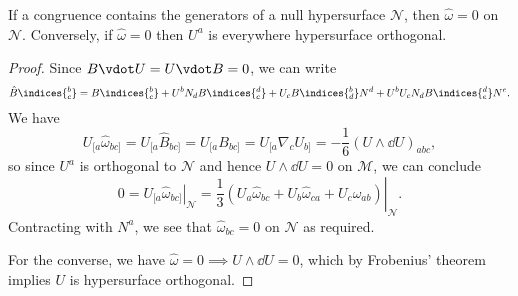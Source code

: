 \documentclass{jknotes}
\begin{document}
\begin{lemma}
    If a congruence contains the generators of a null hypersurface \(\mathcal{N}\), then \(\hat{\omega}=0\) on \(\mathcal{N}\). Conversely, if \(\hat{\omega}=0\) then \(U^a\) is everywhere hypersurface orthogonal.
\end{lemma}
\begin{proof}
    Since \(B\vdot U = U\vdot B = 0\), we can write 
    \begin{equation}
        \hat{B}\indices{^b_c} = B\indices{^b_c} + U^bN_dB\indices{^d_c} + U_cB\indices{^b_d}N^d + U^bU_c N_dB\indices{^d_e}N^e.
    \end{equation}
    We have
    \begin{equation}
        U_{[a}\hat{\omega}_{bc]} = U_{[a}\hat{B}_{bc]} 
                                 = U_{[a}B_{bc]} 
                                 = U_{[a}\nabla_cU_{b]} 
                                 = - \frac{1}{6} (U\wedge\dd{U})_{abc},
    \end{equation}
    so since \(U^a\) is orthogonal to \(\mathcal{N}\) and hence \(U\wedge\dd{U} = 0\) on \(\mathcal{M}\), we can conclude
    \begin{equation}
        0 = \left. U_{[a}\hat{\omega}_{bc]} \right|_{\mathcal{N}} = \left.\frac{1}{3}(U_a\hat{\omega}_{bc} + U_b\hat{\omega}_{ca} + U_c\hat{\omega}_{ab}) \right|_{\mathcal{N}}.
    \end{equation}
    Contracting with \(N^a\), we see that \(\hat{\omega}_{bc} = 0\) on \(\mathcal{N}\) as required.

    For the converse, we have \(\hat{\omega} = 0 \implies U\wedge\dd{U}=0\), which by Frobenius' theorem implies \(U\) is hypersurface orthogonal.
\end{proof}
\end{document}
